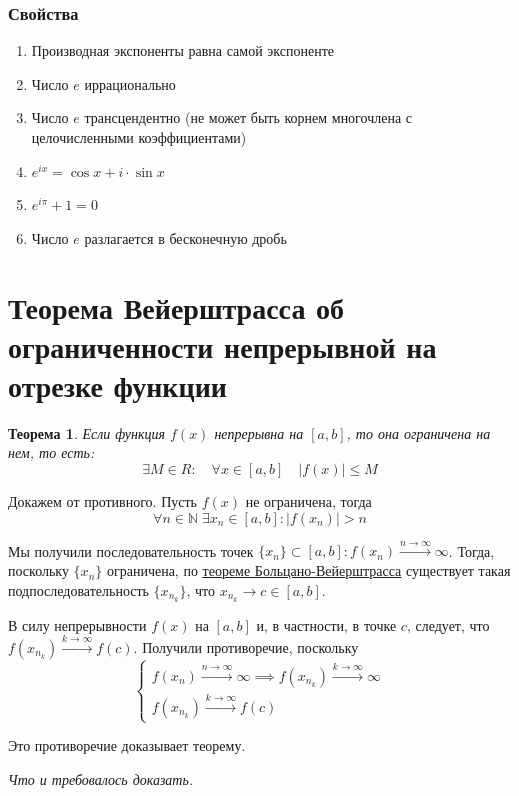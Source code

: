 \documentclass[a4paper,12pt,oneside]{extbook}
\newcommand{\newpar}{$ $\par\nobreak\ignorespaces}
\theoremstyle{numbered}
\theoremstyle{unnumbered}
\newtheorem*{theorem*}{Теорема}
\theoremstyle{named}
\theoremstyle{unnumbered}
\theoremstyle{named}
\theoremstyle{named}
\theoremstyle{named}
\renewenvironment{proof}[1][]{\breakenv[Доказательство]{\if\relax\detokenize{#1}\relax\else\;\fi}{\textbf{#1}}}{\smallskip\newpar \hfill\textit{Что и требовалось доказать.}}
\newcommand{\plink}[2]{\hyperref[#1]{\color{blue}\underline{#2}}}
\begin{document}
\subsubsection{Свойства}
\begin{enumerate}
    \item {Производная экспоненты равна самой экспоненте}
    \item {Число \(e\) иррационально}
    \item {Число \(e\) трансцендентно (не может быть корнем многочлена с целочисленными коэффициентами)}
    \item {\(e^{ix} = \cos{x} + i \cdot \sin{x}\)}
    \item {\(e^{i\pi} + 1 = 0\)}
    \item {Число \(e\) разлагается в бесконечную дробь}
\end{enumerate}

\section{Теорема Вейерштрасса об ограниченности непрерывной на отрезке функции}%
\label{sec:Теорема Вейерштрасса об ограниченности непрерывной на отрезке функции}

\begin{theorem*}
    Если функция \(f(x)\) непрерывна на \([a, b]\), то она ограничена на нем, то есть:
    \[
        \exists M \in R: \quad \forall x \in [a, b] \quad |f(x)| \leq M
    \]
\end{theorem*}

\begin{proof}
    Докажем от противного. Пусть \(f(x)\) не ограничена, тогда
    \[
        \forall n \in \mathbb{N} \; \exists x_n \in [a, b]: |f(x_n)| > n
    \]

    Мы получили последовательность точек \(\{x_n\} \subset [a, b]: f(x_n) \overset{n \to \infty}{\longrightarrow} \infty\). Тогда, поскольку \(\{x_n\}\) ограничена, по \plink{sec:Теорема Больцано-Вейерштрасса}{теореме Больцано-Вейерштрасса} существует такая подпоследовательность \(\{x_{n_k}\}\), что \(x_{n_k} \rightarrow c \in [a, b]\).

    В силу непрерывности \(f(x)\) на \([a, b]\) и, в частности, в точке \(c\), следует, что \(f(x_{n_k}) \overset{k \to \infty}{\longrightarrow} f(c)\). Получили противоречие, поскольку
    \[
        \begin{cases}
            f(x_n) \overset{n \to \infty}{\longrightarrow} \infty \implies f(x_{n_k}) \overset{k \to \infty}{\longrightarrow} \infty \\
            f(x_{n_k}) \overset{k \to \infty}{\longrightarrow} f(c)
        \end{cases}
    \]

    Это противоречие доказывает теорему.
\end{proof}
\end{document}
